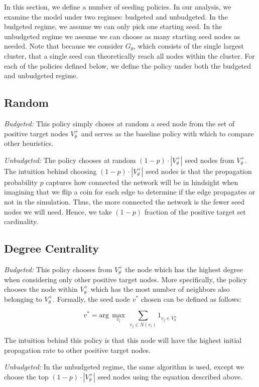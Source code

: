 In this section, we define a number of seeding policies. In our analysis, we examine the model under two regimes: budgeted and unbudgeted. In the budgeted regime, we assume we can only pick one starting seed. In the unbudgeted regime we assume we can choose as many starting seed nodes as needed. Note that because we consider $G_\theta$, which consists of the single largest cluster, that a single seed can theoretically reach all nodes within the cluster. For each of the policies defined below, we define the policy under both the budgeted and unbudgeted regime. 

\subsection{Random} 
\textit{Budgeted:}
This policy simply choses at random a seed node from the set of positive target nodes $V_\theta^+$ and serves as the baseline policy with which to compare other heuristics.

\textit{Unbudgeted:}
The policy chooses at random $(1-p) \cdot |V_\theta^+|$ seed nodes from $V_\theta^+$. The intuition behind choosing $(1-p) \cdot |V_\theta^+|$ seed nodes is that the propagation probability $p$ captures how connected the network will be in hindsight when imagining that we flip a coin for each edge to determine if the edge propagates or not in the simulation. Thus, the more connected the network is the fewer seed nodes we will need. Hence, we take $(1-p)$ fraction of the positive target set cardinality. 

\subsection{Degree Centrality} 
\textit{Budgeted:}
This policy chooses from $V_\theta^+$ the node which has the highest degree when considering only other positive target nodes. More specifically, the policy chooses the node within $V_\theta^+$ which has the most number of neighbors also belonging to $V_\theta^+$. Formally, the seed node $v^*$ chosen can be defined as follows: 

\begin{equation}
	v^* = \text{arg}\,\max\limits_{v_i}\  \sum_{v_j \in N(v_i)} 1_{v_j \in V_\theta^+}
\end{equation}

The intuition behind this policy is that this node will have the highest initial propagation rate to other positive target nodes.

\textit{Unbudgeted:}
In the unbudgeted regime, the same algorithm is used, except we choose the top $(1-p) \cdot |V_\theta^+|$ seed nodes using the equation described above.

